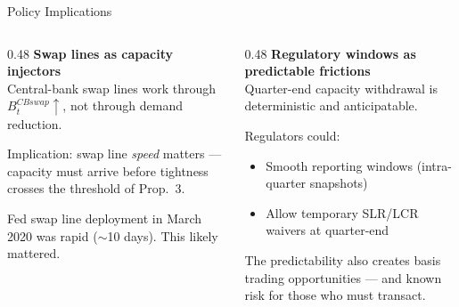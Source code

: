 \documentclass[aspectratio=169, 10pt]{beamer}
\newcommand{\Bt}{B_t}                %
\begin{document}
\begin{frame}{Policy Implications}

  \begin{columns}
    \begin{column}{0.48\textwidth}
      \textbf{Swap lines as capacity injectors}\\[0.3em]
      Central-bank swap lines work through $\Bt^{CBswap} \uparrow$,
      not through demand reduction.

      \medskip
      Implication: swap line \emph{speed} matters --- capacity must arrive
      before tightness crosses the threshold of Prop.~3.

      \medskip
      {\color{dimgray}\small Fed swap line deployment in March 2020 was rapid
        ($\sim$10 days). This likely mattered.}
    \end{column}
    \begin{column}{0.48\textwidth}
      \textbf{Regulatory windows as predictable frictions}\\[0.3em]
      Quarter-end capacity withdrawal is deterministic and anticipatable.

      \medskip
      Regulators could:
      \begin{itemize}
        \item Smooth reporting windows (intra-quarter snapshots)
        \item Allow temporary SLR/LCR waivers at quarter-end
      \end{itemize}

      \medskip
      {\color{dimgray}\small The predictability also creates basis trading
        opportunities --- and known risk for those who must transact.}
    \end{column}
  \end{columns}

\end{frame}
\end{document}

